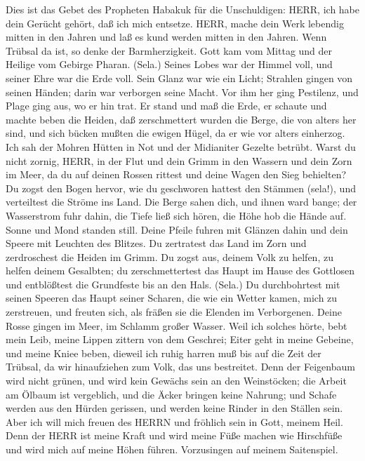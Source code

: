  Dies ist das Gebet des Propheten Habakuk für die
Unschuldigen:  HERR, ich habe dein Gerücht gehört, daß ich
mich entsetze. HERR, mache dein Werk lebendig mitten in den Jahren und
laß es kund werden mitten in den Jahren. Wenn Trübsal da ist, so denke
der Barmherzigkeit.  Gott kam vom Mittag und der Heilige vom
Gebirge Pharan. (Sela.) Seines Lobes war der Himmel voll, und seiner
Ehre war die Erde voll.  Sein Glanz war wie ein Licht;
Strahlen gingen von seinen Händen; darin war verborgen seine Macht.
 Vor ihm her ging Pestilenz, und Plage ging aus, wo er hin
trat.  Er stand und maß die Erde, er schaute und machte
beben die Heiden, daß zerschmettert wurden die Berge, die von alters her
sind, und sich bücken mußten die ewigen Hügel, da er wie vor alters
einherzog.  Ich sah der Mohren Hütten in Not und der
Midianiter Gezelte betrübt.  Warst du nicht zornig, HERR, in
der Flut und dein Grimm in den Wassern und dein Zorn im Meer, da du auf
deinen Rossen rittest und deine Wagen den Sieg behielten? 
Du zogst den Bogen hervor, wie du geschworen hattest den Stämmen
(sela!), und verteiltest die Ströme ins Land.  Die Berge
sahen dich, und ihnen ward bange; der Wasserstrom fuhr dahin, die Tiefe
ließ sich hören, die Höhe hob die Hände auf.  Sonne und
Mond standen still. Deine Pfeile fuhren mit Glänzen dahin und dein
Speere mit Leuchten des Blitzes.  Du zertratest das Land im
Zorn und zerdroschest die Heiden im Grimm.  Du zogst aus,
deinem Volk zu helfen, zu helfen deinem Gesalbten; du zerschmettertest
das Haupt im Hause des Gottlosen und entblößtest die Grundfeste bis an
den Hals. (Sela.)  Du durchbohrtest mit seinen Speeren das
Haupt seiner Scharen, die wie ein Wetter kamen, mich zu zerstreuen, und
freuten sich, als fräßen sie die Elenden im Verborgenen. 
Deine Rosse gingen im Meer, im Schlamm großer Wasser.  Weil
ich solches hörte, bebt mein Leib, meine Lippen zittern von dem
Geschrei; Eiter geht in meine Gebeine, und meine Kniee beben, dieweil
ich ruhig harren muß bis auf die Zeit der Trübsal, da wir hinaufziehen
zum Volk, das uns bestreitet.  Denn der Feigenbaum wird
nicht grünen, und wird kein Gewächs sein an den Weinstöcken; die Arbeit
am Ölbaum ist vergeblich, und die Äcker bringen keine Nahrung; und
Schafe werden aus den Hürden gerissen, und werden keine Rinder in den
Ställen sein.  Aber ich will mich freuen des HERRN und
fröhlich sein in Gott, meinem Heil.  Denn der HERR ist
meine Kraft und wird meine Füße machen wie Hirschfüße und wird mich auf
meine Höhen führen. Vorzusingen auf meinem Saitenspiel.
